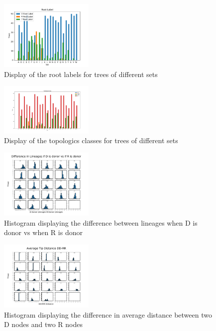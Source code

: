 \documentclass[final,5p,times,twocolumn,authoryear]{elsarticle}
\begin{document}
  
\begin{figure}
	\centering 
	\includegraphics[width=0.4\textwidth, angle=0]{sumstat1graph.pdf}	
	\caption{Display of the root labels for trees of different sets} 
	\label{fig_mom0}%
\end{figure}

\begin{figure}
	\centering 
	\includegraphics[width=0.4\textwidth, angle=0]{sumstat2graph.pdf}	
	\caption{Display of the topologics classes for trees of different sets} 
	\label{fig_mom0}%
\end{figure}

\begin{figure}
	\centering 
	\includegraphics[width=0.4\textwidth, angle=0]{sumstat3hist.pdf}	
	\caption{Histogram displaying the difference between lineages when D is donor vs when R is donor} 
	\label{fig_mom0}%
\end{figure}

\begin{figure}
	\centering 
	\includegraphics[width=0.4\textwidth, angle=0]{dd_rr_distance.pdf}	
	\caption{Histogram displaying the difference in average distance between two D nodes and two R nodes} 
	\label{fig_mom0}%
\end{figure}
\end{document}
